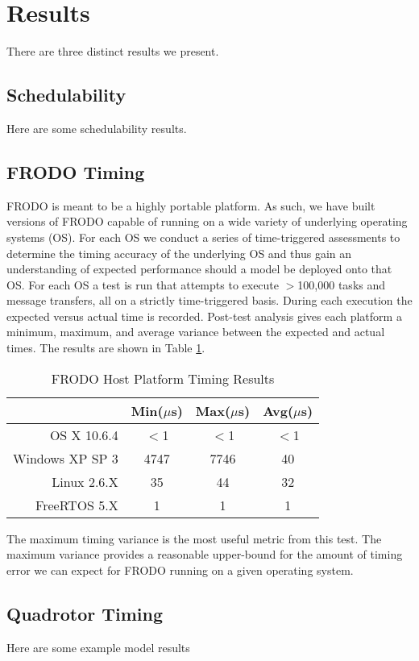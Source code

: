 \section{Results}

There are three distinct results we present.

\subsection{Schedulability}

Here are some schedulability results.


\subsection{FRODO Timing}

FRODO is meant to be a highly portable platform.  As such, we have built versions of FRODO capable of running on a wide variety of underlying operating systems (OS).  For each OS we conduct a series of time-triggered assessments to determine the timing accuracy of the underlying OS and thus gain an understanding of expected performance should a model be deployed onto that OS.  For each OS a test is run that attempts to execute $>$100,000 tasks and message transfers, all on a strictly time-triggered basis.  During each execution the expected versus actual time is recorded.  Post-test analysis gives each platform a minimum, maximum, and average variance between the expected and actual times.  The results are shown in Table \ref{Table:FRODO_Platform_Timing}.

\begin{table}[htb]
\begin{center}
\begin{tabular}{| r | c | c | c |}
\hline
& \bf{Min($\mu$s)} & \bf{Max($\mu$s) } & \bf{Avg($\mu$s)} \\ \hline
OS X 10.6.4 & $<$1 & $<$1 & $<$1 \\ \hline
Windows XP SP 3& 4747 & 7746 & 40 \\ \hline
Linux 2.6.X & 35 & 44 & 32 \\ \hline
FreeRTOS 5.X & 1 & 1 & 1 \\
\hline
\end{tabular}
\end{center}
\caption{FRODO Host Platform Timing Results}
\label{Table:FRODO_Platform_Timing}
\end{table}

The maximum timing variance is the most useful metric from this test.  The maximum variance provides a reasonable upper-bound for the amount of timing error we can expect for FRODO running on a given operating system.


\subsection{Quadrotor Timing}

Here are some example model results